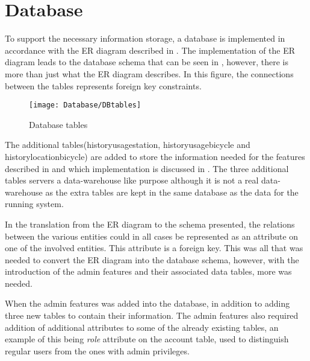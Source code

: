 \section{Database}
To support the necessary information storage, a database is implemented in accordance with the ER diagram described in .
The implementation of the ER diagram leads to the database schema that can be seen in , however, there is more than just what the ER diagram describes.
In this figure, the connections between the tables represents foreign key constraints.

\begin{figure}[h]
	\centering
	\texttt{[image: Database/DBtables]}
	\caption{Database tables}\label{fig:Database-tables}
\end{figure}

The additional tables(historyusagestation, historyusagebicycle and historylocationbicycle) are added to store the information needed for the features described in  and which implementation is discussed in .
The three additional tables servers a data-warehouse like purpose although it is not a real data-warehouse as the extra tables are kept in the same database as the data for the running system.

In the translation from the ER diagram to the schema presented, the relations between the various entities could in all cases be represented as an attribute on one of the involved entities.
This attribute is a foreign key.
This was all that was needed to convert the ER diagram into the database schema, however, with the introduction of the admin features and their associated data tables, more was needed.

When the admin features was added into the database, in addition to adding three new tables to contain their information.
The admin features also required addition of additional attributes to some of the already existing tables, an example of this being \textit{role} attribute on the account table, used to distinguish regular users from the ones with admin privileges.